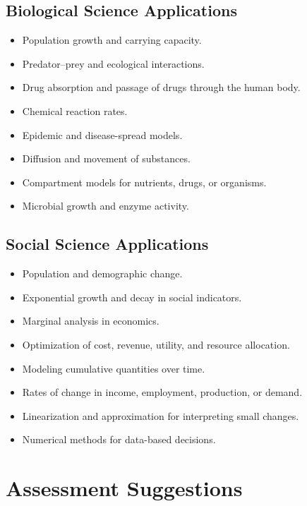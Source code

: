 \documentclass[11pt]{article}
\begin{document}
\subsection{Biological Science Applications}

\begin{itemize}
    \item Population growth and carrying capacity.
    \item Predator--prey and ecological interactions.
    \item Drug absorption and passage of drugs through the human body.
    \item Chemical reaction rates.
    \item Epidemic and disease-spread models.
    \item Diffusion and movement of substances.
    \item Compartment models for nutrients, drugs, or organisms.
    \item Microbial growth and enzyme activity.
\end{itemize}

\subsection{Social Science Applications}

\begin{itemize}
    \item Population and demographic change.
    \item Exponential growth and decay in social indicators.
    \item Marginal analysis in economics.
    \item Optimization of cost, revenue, utility, and resource allocation.
    \item Modeling cumulative quantities over time.
    \item Rates of change in income, employment, production, or demand.
    \item Linearization and approximation for interpreting small changes.
    \item Numerical methods for data-based decisions.
\end{itemize}

\section{Assessment Suggestions}
\end{document}
